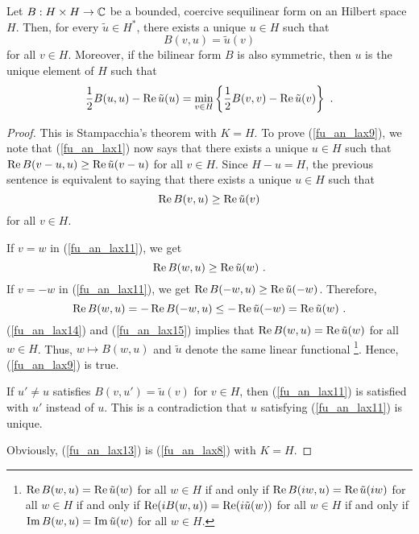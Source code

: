 \begin{cor} \label{fu_an_LaxMilgTh}
Let $B:H\times H\rightarrow \mathbb{C}$ be a bounded, coercive sequilinear form
on an Hilbert space $H$.  
Then, for every $\displaystyle \tilde{u} \in H^\ast$, there
exists a unique $u\in H$ such that
\begin{equation} \label{fu_an_lax9}
B(v,u) = \tilde{u}(v)
\end{equation}
for all $v \in H$.  Moreover, if the bilinear form $B$ is also
symmetric, then $u$ is the unique element of $H$ such that
\begin{equation} \label{fu_an_lax13}
\frac{1}{2}B(u,u) - \operatorname{Re} \tilde{u}(u) = \min_{v\in H} \left\{
\frac{1}{2}B(v,v) - \operatorname{Re} \tilde{u}(v) \right\} \  .
\end{equation}
\end{cor}

\begin{proof}
This is Stampacchia's theorem with $K=H$.  To prove
(\ref{fu_an_lax9}), we note that (\ref{fu_an_lax1}) now says that
there exists a unique $u\in H$ such that
$\displaystyle \operatorname{Re} B(v-u,u) \geq \operatorname{Re} \tilde{u}(v-u)$ for all $v\in H$.
Since $H-u = H$, the previous sentence is equivalent to saying that
there exists a unique $u\in H$ such that
\begin{equation} \label{fu_an_lax11}
\operatorname{Re} B(v,u) \geq \operatorname{Re} \tilde{u}(v)
\end{equation}
for all $v\in H$.
 
If $v = w$ in (\ref{fu_an_lax11}), we get
\begin{equation}\label{fu_an_lax14}
\operatorname{Re} B(w,u) \geq \operatorname{Re} \tilde{u}(w) \ .
\end{equation}
If $v = -w$ in (\ref{fu_an_lax11}), we get
$\operatorname{Re} B(-w,u) \geq \operatorname{Re} \tilde{u}(-w)$.
Therefore,
\begin{equation}\label{fu_an_lax15}
\RE B(w,u) = - \RE B(-w,u) \leq - \RE \tilde{u}(-w) = \RE \tilde{u}(w) \ .
\end{equation}
(\ref{fu_an_lax14}) and (\ref{fu_an_lax15}) implies that
$\displaystyle \operatorname{Re} B(w,u) = \operatorname{Re} \tilde{u}(w)$ for all $w \in H$.
Thus, $w\mapsto B(w,u)$ and $\tilde{u}$ denote the same linear
functional \footnote{
$\displaystyle \operatorname{Re} B(w,u) = \operatorname{Re} \tilde{u}(w)$ for all $w \in H$
if and only if $\displaystyle \operatorname{Re} B(i w,u) = \operatorname{Re} \tilde{u}(iw)$ for all $w \in H$
if and only if $\displaystyle \operatorname{Re} (i B(w,u)) = \operatorname{Re} (i\tilde{u}(w))$ for all $w \in H$
if and only if $\displaystyle \operatorname{Im} B(w,u) = \operatorname{Im} \tilde{u}(w)$ for all $w \in H$.
}.  Hence, (\ref{fu_an_lax9}) is true.

If $u' \neq u$ satisfies $B(v,u') = \tilde{u}(v)$ for $v \in H$, then 
(\ref{fu_an_lax11}) is satisfied with $u'$ instead of $u$.  This is a
contradiction that $u$ satisfying (\ref{fu_an_lax11}) is unique.

Obviously, (\ref{fu_an_lax13}) is (\ref{fu_an_lax8}) with $K = H$.
\end{proof}

